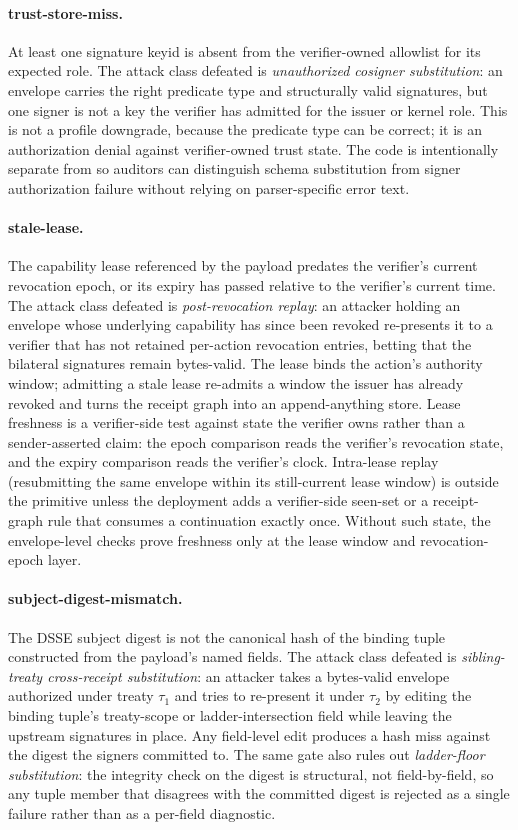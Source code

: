 \paragraph{trust-store-miss.} At least one signature keyid is absent from the verifier-owned allowlist for its expected role. The attack class defeated is \emph{unauthorized cosigner substitution}: an envelope carries the right predicate type and structurally valid signatures, but one signer is not a key the verifier has admitted for the issuer or kernel role. This is not a profile downgrade, because the predicate type can be correct; it is an authorization denial against verifier-owned trust state. The code is intentionally separate from  so auditors can distinguish schema substitution from signer authorization failure without relying on parser-specific error text.

\paragraph{stale-lease.} The capability lease referenced by the payload predates the verifier's current revocation epoch, or its expiry has passed relative to the verifier's current time. The attack class defeated is \emph{post-revocation replay}: an attacker holding an envelope whose underlying capability has since been revoked re-presents it to a verifier that has not retained per-action revocation entries, betting that the bilateral signatures remain bytes-valid. The lease binds the action's authority window; admitting a stale lease re-admits a window the issuer has already revoked and turns the receipt graph into an append-anything store. Lease freshness is a verifier-side test against state the verifier owns rather than a sender-asserted claim: the epoch comparison reads the verifier's revocation state, and the expiry comparison reads the verifier's clock. Intra-lease replay (resubmitting the same envelope within its still-current lease window) is outside the primitive unless the deployment adds a verifier-side seen-set or a receipt-graph rule that consumes a continuation exactly once. Without such state, the envelope-level checks prove freshness only at the lease window and revocation-epoch layer.

\paragraph{subject-digest-mismatch.} The DSSE subject digest is not the canonical hash of the binding tuple constructed from the payload's named fields. The attack class defeated is \emph{sibling-treaty cross-receipt substitution}: an attacker takes a bytes-valid envelope authorized under treaty $\tau_1$ and tries to re-present it under $\tau_2$ by editing the binding tuple's treaty-scope or ladder-intersection field while leaving the upstream signatures in place. Any field-level edit produces a hash miss against the digest the signers committed to. The same gate also rules out \emph{ladder-floor substitution}: the integrity check on the digest is structural, not field-by-field, so any tuple member that disagrees with the committed digest is rejected as a single failure rather than as a per-field diagnostic.


